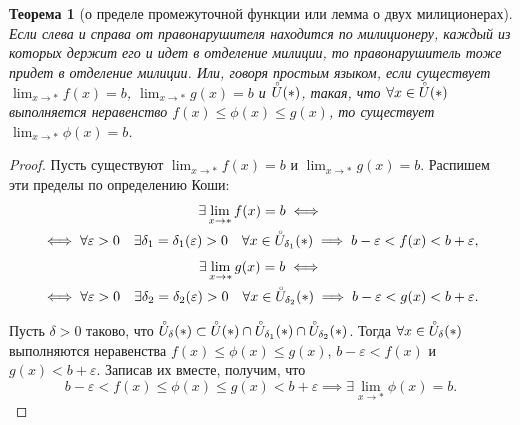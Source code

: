 \documentclass[a4paper,12pt]{article} %
\newtheorem{theorem}{Теорема}[section]
\theoremstyle{remark}
\theoremstyle{definition}
\begin{document}
\begin{theorem}[о пределе промежуточной функции или лемма о двух милиционерах]
	Если слева и справа от правонарушителя находится по милиционеру, каждый из которых держит его и идет в отделение милиции, то правонарушитель тоже придет в отделение милиции. Или, говоря простым языком, если существует $\lim_{x \to *} f(x) = b$, $\lim_{x \to *} g(x) = b$ и $\accentset{\circ}{U}(*)$, такая, что $\forall x\in \accentset{\circ}{U}(*)$ выполняется неравенство $f(x) \le \phi(x) \le g(x)$, то существует $\lim_{x \to *} \phi(x) = b$.
\end{theorem}
\begin{proof}
	Пусть существуют $\lim_{x \to *} f(x) = b$ и $\lim_{x \to *} g(x) = b$. Распишем эти пределы по определению Коши:
	\begin{multline}
		\exists \lim_{x \to *} f(x) = b \iff \\
		\iff \forall \varepsilon>0 \quad \exists \delta_1 = \delta_1(\varepsilon) > 0 \quad \forall x\in \accentset{\circ}{U}_{\delta_1}(*) \implies b-\varepsilon < f(x) < b + \varepsilon,
	\end{multline}
	\begin{multline}
		\exists \lim_{x \to *} g(x) = b \iff \\
		\iff \forall \varepsilon>0 \quad \exists \delta_2 = \delta_2(\varepsilon) > 0 \quad \forall x\in \accentset{\circ}{U}_{\delta_2}(*) \implies b-\varepsilon < g(x) < b + \varepsilon.
	\end{multline}

	Пусть $\delta>0$ таково, что $\accentset{\circ}{U}_\delta(*) \subset \accentset{\circ}{U}(*)\cap \accentset{\circ}{U}_{\delta_1}(*) \cap \accentset{\circ}{U}_{\delta_2}(*)$. Тогда $\forall x \in \accentset{\circ}{U}_\delta(*)$ выполняются неравенства
	$f(x) \le \phi(x) \le g(x)$, $b-\varepsilon < f(x)$ и $g(x) < b + \varepsilon$.
	Записав их вместе, получим, что
	\[
	b - \varepsilon < f(x) \le \phi(x) \le g(x) < b + \varepsilon \implies \exists \lim_{x \to *} \phi(x) = b
	.\] 
\end{proof}
\end{document}
